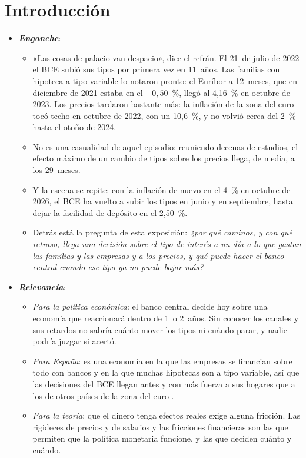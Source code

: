\documentclass[11pt]{article}
\begin{document}
\tceetitulo

\section*{Introducción}

\begin{itemize}
\item \textbf{\emph{Enganche}}:
  \begin{itemize}
  \item «Las cosas de palacio van despacio», dice el refrán. El 21~de julio de 2022 el BCE subió sus tipos por primera vez en 11~años\nocite{BCE2026TiposOficiales}. Las familias con hipoteca a tipo variable lo notaron pronto: el Euríbor a 12~meses, que en diciembre de 2021 estaba en el $-0{,}50$~\%, llegó al 4,16~\% en octubre de 2023\nocite{BCE2026FMEuribor}. Los precios tardaron bastante más: la inflación de la zona del euro tocó techo en octubre de 2022, con un 10,6~\%, y no volvió cerca del 2~\% hasta el otoño de 2024\nocite{Eurostat2026IAPC}.
  \item No es una casualidad de aquel episodio: reuniendo decenas de estudios, el efecto máximo de un cambio de tipos sobre los precios llega, de media, a los 29~meses\nocite{HavranekRusnak2013}.
  \item Y la escena se repite: con la inflación de nuevo en el 4~\% en octubre de 2026\nocite{Eurostat2026IAPCoct}, el BCE ha vuelto a subir los tipos en junio y en septiembre, hasta dejar la facilidad de depósito en el 2,50~\%\nocite{BCE2026Decisiones}.
  \item Detrás está la pregunta de esta exposición: \emph{¿por qué caminos, y con qué retraso, llega una decisión sobre el tipo de interés a un día a lo que gastan las familias y las empresas y a los precios, y qué puede hacer el banco central cuando ese tipo ya no puede bajar más?}
  \end{itemize}

\item \textbf{\emph{Relevancia}}:
  \begin{itemize}
  \item \emph{Para la política económica}: el banco central decide hoy sobre una economía que reaccionará dentro de 1~o 2~años. Sin conocer los canales y sus retardos no sabría cuánto mover los tipos ni cuándo parar, y nadie podría juzgar si acertó.
  \item \emph{Para España}: es una economía en la que las empresas se financian sobre todo con bancos y en la que muchas hipotecas son a tipo variable, así que las decisiones del BCE llegan antes y con más fuerza a sus hogares que a los de otros países de la zona del euro .
  \item \emph{Para la teoría}: que el dinero tenga efectos reales exige alguna fricción. Las rigideces de precios y de salarios y las fricciones financieras son las que permiten que la política monetaria funcione, y las que deciden cuánto y cuándo.
  \end{itemize}


\end{itemize}
\end{document}
